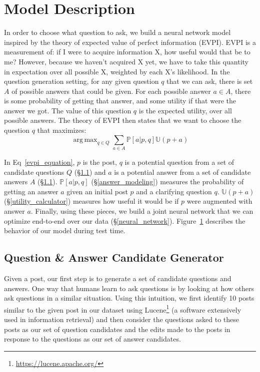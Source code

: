 \documentclass[11pt,a4paper]{article}
\DeclareMathOperator*{\argmax}{arg\,max}
\newcommand{\U}{\mathbb{U}}
\begin{document}
\section{Model Description}\label{model}

In order to choose what question to ask, we build a neural network model inspired by the theory of expected value of perfect information (EVPI). EVPI is a measurement of: if I were to acquire information X, how useful would that be to me? However, because we haven't acquired X yet, we have to take this quantity in expectation over all possible X, weighted by each X's likelihood. In the question generation setting, for any given question $q$ that we can ask, there is set $A$ of possible answers that could be given. For each possible answer $a \in A$, there is some probability of getting that answer, and some utility if that were the answer we got. The value of this question $q$ is the expected utility, over all possible answers. The theory of EVPI then states that we want to choose the question $q$ that maximizes:
\begin{equation}\label{evpi_equation}
\argmax_{q \in Q} \sum_{a \in A} \mathbb{P}[a | p,q] \U(p+a)
\end{equation} 

In Eq~\ref{evpi_equation}, $p$ is the post, $q$ is a potential question from a set of candidate questions $Q$ (\S\ref{question_candidate_generator}) and $a$ is a potential answer from a set of candidate answers $A$ (\S\ref{question_candidate_generator}). $\mathbb{P}[a | p,q]$ (\S\ref{answer_modeling}) measures the probability of getting an answer $a$ given an initial post $p$ and a clarifying question $q$. $\U(p+a)$ (\S\ref{utility_calculator}) measures how useful it would be if $p$ were augmented with answer $a$. Finally, using these pieces, we build a joint neural network that we can optimize end-to-end over our data (\S\ref{neural_network}). Figure~\ref{model} describes the behavior of our model during test time. 

\subsection{Question \& Answer Candidate Generator}\label{question_candidate_generator}

Given a post, our first step is to generate a set of candidate questions and answers. One way that humans learn to ask questions is by looking at how others ask questions in a similar situation. Using this intuition, we first identify 10 posts similar to the given post in our dataset using Lucene\footnote{\url{https://lucene.apache.org/}} (a software extensively used in information retrieval) and then consider the questions asked to these posts as our set of question candidates and the edits made to the posts in response to the questions as our set of answer candidates.
\end{document}
